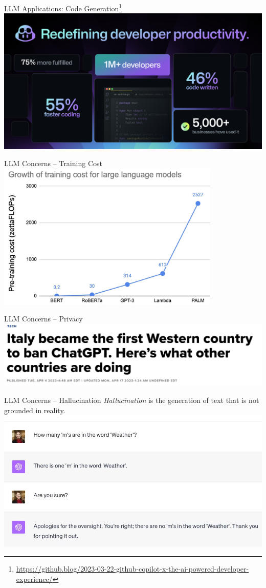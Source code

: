 \documentclass[presentation, 10pt]{beamer}\mode<presentation>{\usetheme{AMSBolognaFC}}
\begin{document}
\begin{frame}{LLM Applications: Code Generation\footnote{\url{https://github.blog/2023-03-22-github-copilot-x-the-ai-powered-developer-experience/}}}
\includegraphics[width=\textwidth]{img/copilot.png}
\end{frame}
\begin{frame}{LLM Concerns -- Training Cost}
\centering
\includegraphics[width=0.8\textwidth]{img/training-cost.jpg}
\end{frame}
\begin{frame}{LLM Concerns -- Privacy}
	\includegraphics[width=\textwidth]{img/italy-privacy-concern.png}
\end{frame}
\begin{frame}{LLM Concerns -- Hallucination}
\emph{Hallucination} is the generation of text that is not grounded in reality.
\includegraphics[width=\textwidth]{img/hallucinations.png}
\end{frame}
\end{document}
